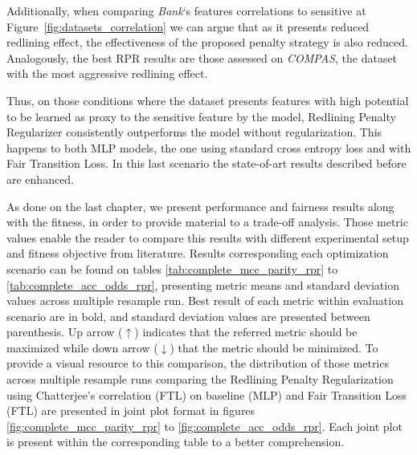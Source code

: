 Additionally, when comparing \textit{Bank}`s features correlations to sensitive at Figure~\ref{fig:datasets_correlation} we can argue that as it presents reduced redlining effect, the effectiveness of the proposed penalty strategy is also reduced. Analogously, the best RPR results are those assessed on \textit{COMPAS}, the dataset with the most aggressive redlining effect.

Thus, on those conditions where the dataset presents features with high potential to be learned as proxy to the sensitive feature by the model, Redlining Penalty Regularizer consistently outperforms the model without regularization. This happens to both MLP models, the one using standard cross entropy loss and with Fair Transition Loss. In this last scenario the state-of-art results described before are enhanced.

As done on the last chapter, we present performance and fairness results along with the fitness, in order to provide material to a trade-off analysis. Those metric values enable the reader to compare this results with different experimental setup and fitness objective from literature. Results corresponding each optimization scenario can be found on tables \ref{tab:complete_mcc_parity_rpr} to \ref{tab:complete_acc_odds_rpr}, presenting metric means and standard deviation values across multiple resample run. Best result of each metric within evaluation scenario are in bold, and standard deviation values are presented between parenthesis. Up arrow ($\uparrow$) indicates that the referred metric should be maximized while down arrow ($\downarrow$) that the metric should be minimized. To provide a visual resource to this comparison, the distribution of those metrics across multiple resample runs comparing the Redlining Penalty Regularization using Chatterjee's correlation (FTL) on baseline (MLP) and Fair Transition Loss (FTL) are presented in joint plot format in figures \ref{fig:complete_mcc_parity_rpr} to \ref{fig:complete_acc_odds_rpr}. Each joint plot is present within the corresponding table to a better comprehension.

\newpage

